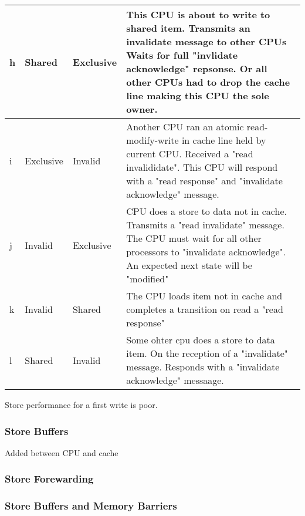 \documentclass{article}
\begin{document}
\begin{tabular*}{0.75\textwidth} {| l | l | l | p{5cm}| }
    \\
    \hline
    h & Shared & Exclusive & 

    This CPU is about to write to shared item. Transmits an invalidate
    message to other CPUs Waits for full "invlidate acknowledge"
    repsonse. Or all other CPUs had to drop the cache line making this
    CPU the sole owner. \\
    \hline
    i & Exclusive & Invalid & 

    Another CPU ran an atomic read-modify-write in cache line held by
    current CPU. Received a "read invalididate". This CPU will respond
    with a "read response" and "invalidate acknowledge" message.   \\

    \hline

    j & Invalid & Exclusive &

    CPU does a store to data not in cache. Transmits a "read
    invalidate" message. The CPU must wait for all other processors to
    "invalidate acknowledge". An expected next state will be
    "modified"  
    \\
    \hline

    k & Invalid & Shared &
    
    The CPU loads item not in cache and completes a transition on read
    a "read response"     \\


    \hline
    l & Shared & Invalid &
    
    Some ohter cpu does a store to data item. On the reception of a
    "invalidate" message. Responds with a "invalidate acknowledge"
    messaage. \\

    \hline    
  \end{tabular*}


Store performance for a first write is poor.


\subsubsection{Store Buffers}
Added between CPU and cache
\subsubsection{Store Forewarding}
\subsubsection{Store Buffers and Memory Barriers}
\end{document}
